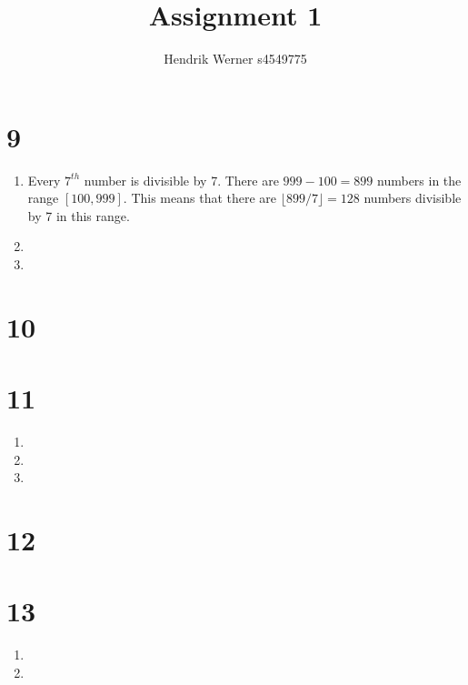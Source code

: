 \documentclass[12pt]{article}
\title{Assignment 1}
\author{
	Hendrik Werner s4549775
}
\begin{document}
\maketitle

\section*{9}
\begin{enumerate}[a]
	\item %
	Every $7^{th}$ number is divisible by 7. There are $999 - 100 = 899$ numbers in the range $[100, 999]$. This means that there are $\lfloor 899 / 7 \rfloor = 128$ numbers divisible by 7 in this range.
	\setcounter{enumi}{3} \item %
	\setcounter{enumi}{6} \item %
\end{enumerate}

\section*{10}

\section*{11}
\begin{enumerate}[a]
	\item %
	\item %
	\item %
\end{enumerate}

\section*{12}

\section*{13}
\begin{enumerate}[a]
	\item %
	\item %
\end{enumerate}
\end{document}

